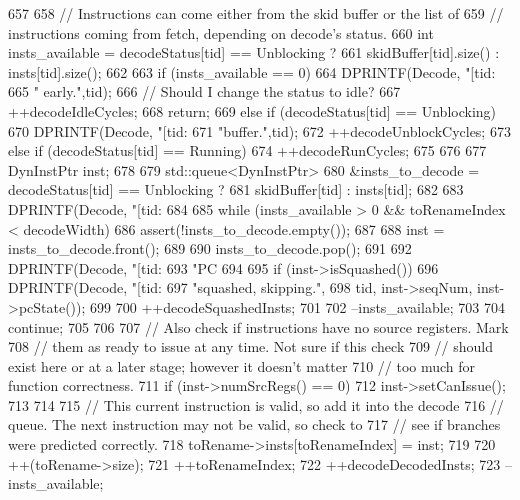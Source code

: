 \begin{DoxyCode}
657 {
658     // Instructions can come either from the skid buffer or the list of
659     // instructions coming from fetch, depending on decode's status.
660     int insts_available = decodeStatus[tid] == Unblocking ?
661         skidBuffer[tid].size() : insts[tid].size();
662 
663     if (insts_available == 0) {
664         DPRINTF(Decode, "[tid:%
665                 " early.\n",tid);
666         // Should I change the status to idle?
667         ++decodeIdleCycles;
668         return;
669     } else if (decodeStatus[tid] == Unblocking) {
670         DPRINTF(Decode, "[tid:%
671                 "buffer.\n",tid);
672         ++decodeUnblockCycles;
673     } else if (decodeStatus[tid] == Running) {
674         ++decodeRunCycles;
675     }
676 
677     DynInstPtr inst;
678 
679     std::queue<DynInstPtr>
680         &insts_to_decode = decodeStatus[tid] == Unblocking ?
681         skidBuffer[tid] : insts[tid];
682 
683     DPRINTF(Decode, "[tid:%
684 
685     while (insts_available > 0 && toRenameIndex < decodeWidth) {
686         assert(!insts_to_decode.empty());
687 
688         inst = insts_to_decode.front();
689 
690         insts_to_decode.pop();
691 
692         DPRINTF(Decode, "[tid:%
693                 "PC %
694 
695         if (inst->isSquashed()) {
696             DPRINTF(Decode, "[tid:%
697                     "squashed, skipping.\n",
698                     tid, inst->seqNum, inst->pcState());
699 
700             ++decodeSquashedInsts;
701 
702             --insts_available;
703 
704             continue;
705         }
706 
707         // Also check if instructions have no source registers.  Mark
708         // them as ready to issue at any time.  Not sure if this check
709         // should exist here or at a later stage; however it doesn't matter
710         // too much for function correctness.
711         if (inst->numSrcRegs() == 0) {
712             inst->setCanIssue();
713         }
714 
715         // This current instruction is valid, so add it into the decode
716         // queue.  The next instruction may not be valid, so check to
717         // see if branches were predicted correctly.
718         toRename->insts[toRenameIndex] = inst;
719 
720         ++(toRename->size);
721         ++toRenameIndex;
722         ++decodeDecodedInsts;
723         --insts_available;
}}
\end{DoxyCode}
